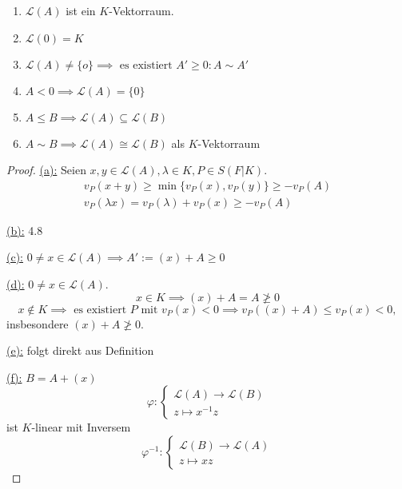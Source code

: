 \begin{lemma}
    \begin{enumerate}
        \item $\mathcal{L}(A)$ ist ein $K$-Vektorraum.
        \item $\mathcal{L}(0) = K$
        \item $\mathcal{L}(A) \ne \{o\} \implies \text{ es existiert } A'\geq 0: A \sim A'$
        \item $ A < 0 \implies \mathcal{L}(A) = \{0\}$
        \item $A \leq B \implies \mathcal{L}(A) \subseteq \mathcal{L}(B)$
        \item $A \sim B \implies \mathcal{L}(A) \cong \mathcal{L}(B)$ als $K$-Vektorraum
    \end{enumerate}
\end{lemma}
\begin{proof}
    \underline{(a):} Seien $x,y \in \mathcal{L}(A), \lambda \in K, P \in S(F|K)$.
    \begin{align*}
        v_P(x + y) \geq \min\{v_P(x), v_P(y)\} \geq - v_P(A)\\
        v_P(\lambda x) = v_P(\lambda) + v_P(x) \geq - v_P(A)
    \end{align*}

    \underline{(b):} 4.8

    \underline{(c):} $0 \ne x \in \mathcal{L}(A) \implies A' := (x) + A \geq 0$

    \underline{(d):} $0 \ne x \in \mathcal{L}(A)$. 
    $$x \in K \implies (x) + A = A \not \geq 0$$
    $$ x \notin K \implies \text{ es existiert } P \text{ mit } v_P(x) < 0 \implies v_P((x) + A) \leq v_P(x) < 0,$$
    insbesondere $(x) + A \not \geq 0$.

    \underline{(e):} folgt direkt aus Definition

    \underline{(f):} $B=A+(x)$ $$ \varphi: \begin{cases}
        \mathcal{L}(A) \to \mathcal{L}(B)\\
        z \mapsto x^{-1}z
    \end{cases}$$
    ist $K$-linear mit Inversem
    $$ \varphi^{-1}: \begin{cases}
        \mathcal{L}(B) \to \mathcal{L}(A)\\
        z \mapsto xz
    \end{cases}$$
\end{proof}